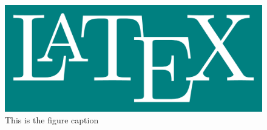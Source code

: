 \documentclass{article}
\begin{document}
  \begin{figure}
    \centering
    \includegraphics[width=0.8\linewidth]{latex.pdf}
    \caption{This is the figure caption}
  \end{figure}
\end{document}
